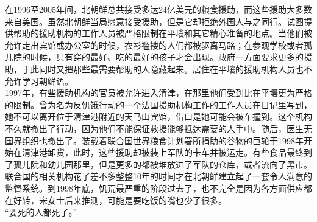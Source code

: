 在1996至2005年间，北朝鲜总共接受多达24亿美元的粮食援助，而这些援助大多数来自美国。虽然北朝鲜当局愿意接受援助，但是它却拒绝外国人与之同行。试图提供帮助的援助机构的工作人员被严格限制在平壤和其它精心准备的地点。当他们被允许走出宾馆或办公室的时候，衣衫褴褛的人们都被驱离马路；在参观学校或者孤儿院的时候，只有穿的最好、吃的最好的孩子才会出现。政府一方面要求更多的援助，于此同时又把那些最需要帮助的人隐藏起来。居住在平壤的援助机构人员也不允许学习朝鲜语。\\

1997年，有些援助机构的官员被允许进入清津，在那里他们受到比在平壤更为严格的限制。曾为名为反饥饿行动的一个法国援助机构工作的工作人员在日记里写到，她不可以离开位于清津港附近的天马山宾馆，借口是她可能会被车撞到。这个机构不久就撤出了行动，因为他们不能保证救援能够抵达需要的人手中。随后，医生无国界组织也撤出了。装载着联合国世界粮食计划署所捐助的谷物的巨轮于1998年开始在清津港卸货，此时，这些援助却被装上军队的卡车并被运走。有些食品最终到了孤儿院和幼儿园那里，但是更多的都被堆放进了军队的仓库，或者流向了黑市。联合国的相关机构花了差不多整整10年的时间才在北朝鲜建立起了一套令人满意的监督系统。到1998年底，饥荒最严重的阶段过去了，也不完全是因为各方面供应都在好转，宋女士后来推测，可能是要吃饭的嘴也少了很多。\\

“要死的人都死了。”\\
